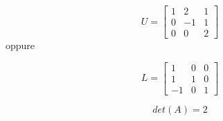 


\[
U=\left[
\begin{array}{ccc}
  1 & 2 & 1 \\
  0 & -1 & 1 \\
  0 & 0 & 2
\end{array}
\right]
\]
\noindent oppure
\bigskip

\[
L=\left[
\begin{array}{ccc}
  1 & 0 & 0 \\
  1 & 1 & 0 \\
  -1 & 0 & 1
\end{array}
\right]
\]

$$det(A)=2$$
